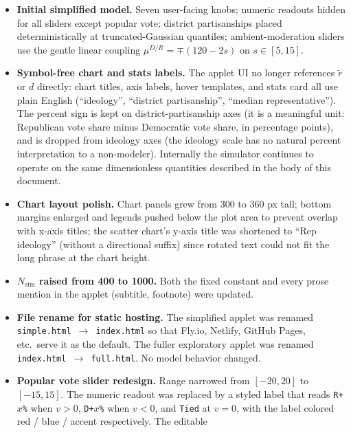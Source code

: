 \documentclass[11pt]{article}
\begin{document}
\begin{itemize}
  \item \textbf{Initial simplified model.} Seven user-facing knobs; numeric
        readouts hidden for all sliders except popular vote; district
        partisanships placed deterministically at truncated-Gaussian quantiles;
        ambient-moderation sliders use the gentle linear coupling
        $\mu^{D/R} = \mp(120 - 2 s)$ on $s \in [5, 15]$.
  \item \textbf{Symbol-free chart and stats labels.} The applet UI no longer
        references $\tilde r$ or $d$ directly: chart titles, axis labels,
        hover templates, and stats card all use plain English (``ideology'',
        ``district partisanship'', ``median representative''). The percent
        sign is kept on district-partisanship axes (it is a meaningful unit:
        Republican vote share minus Democratic vote share, in percentage
        points), and is dropped from ideology axes (the ideology scale has no
        natural percent interpretation to a non-modeler). Internally the
        simulator continues to operate on the same dimensionless quantities
        described in the body of this document.
  \item \textbf{Chart layout polish.} Chart panels grew from 300 to 360 px
        tall; bottom margins enlarged and legends pushed below the plot area
        to prevent overlap with x-axis titles; the scatter chart's y-axis
        title was shortened to ``Rep ideology'' (without a directional
        suffix) since rotated text could not fit the long phrase at the
        chart height.
  \item \textbf{$N_{\text{sim}}$ raised from 400 to 1000.} Both the fixed
        constant and every prose mention in the applet (subtitle, footnote)
        were updated.
  \item \textbf{File rename for static hosting.} The simplified applet was
        renamed \texttt{simple.html $\to$ index.html} so that Fly.io,
        Netlify, GitHub Pages, etc.\ serve it as the default. The fuller
        exploratory applet was renamed \texttt{index.html $\to$ full.html}.
        No model behavior changed.
  \item \textbf{Popular vote slider redesign.} Range narrowed from
        $[-20, 20]$ to $[-15, 15]$. The numeric readout was replaced by a
        styled label that reads \texttt{R+$x$\%} when $v > 0$,
        \texttt{D+$x$\%} when $v < 0$, and \texttt{Tied} at $v = 0$, with
        the label colored red / blue / accent respectively. The editable

\end{itemize}
\end{document}
